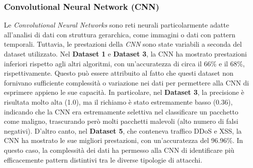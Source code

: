 \subsubsection{Convolutional Neural Network (CNN)}
Le \textit{Convolutional Neural Networks} sono reti neurali particolarmente adatte all'analisi di dati con struttura gerarchica, come immagini o dati con pattern temporali. Tuttavia, le prestazioni della \textit{CNN} sono state variabili a seconda del dataset utilizzato.
Nel \textbf{Dataset 1} e \textbf{Dataset 3}, la CNN ha mostrato prestazioni inferiori rispetto agli altri algoritmi, con un'accuratezza di circa il 66\% e il 68\%, rispettivamente. Questo può essere attribuito al fatto che questi dataset non fornivano sufficiente complessità o variazione nei dati per permettere alla CNN di esprimere appieno le sue capacità. In particolare, nel \textbf{Dataset 3}, la precisione è risultata molto alta (1.0), ma il richiamo è stato estremamente basso (0.36), indicando che la CNN era estremamente selettiva nel classificare un pacchetto come maligno, trascurando però molti pacchetti malevoli (alto numero di falsi negativi).
D'altro canto, nel \textbf{Dataset 5}, che conteneva traffico DDoS e XSS, la CNN ha mostrato le sue migliori prestazioni, con un'accuratezza del 96.96\%. In questo caso, la complessità dei dati ha permesso alla CNN di identificare più efficacemente pattern distintivi tra le diverse tipologie di attacchi.

